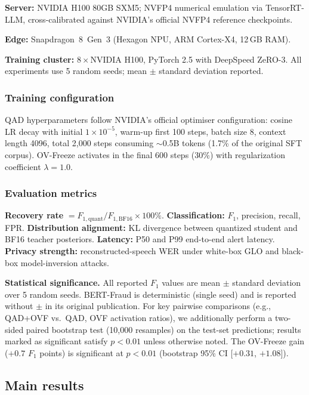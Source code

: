\documentclass[11pt, a4paper]{article}
\begin{document}
\textbf{Server:} NVIDIA H100 80GB SXM5; NVFP4 numerical emulation via TensorRT-LLM, cross-calibrated against NVIDIA's official NVFP4 reference checkpoints.

\textbf{Edge:} Snapdragon~8~Gen~3 (Hexagon NPU, ARM Cortex-X4, 12\,GB RAM).

\textbf{Training cluster:} $8\times$NVIDIA H100, PyTorch 2.5 with DeepSpeed ZeRO-3. All experiments use 5 random seeds; mean $\pm$ standard deviation reported.

\subsubsection{Training configuration}

QAD hyperparameters follow NVIDIA's official optimiser configuration: cosine LR decay with initial $1\times 10^{-5}$, warm-up first 100 steps, batch size 8, context length 4096, total 2{,}000 steps consuming $\sim$0.5B tokens (1.7\% of the original SFT corpus). OV-Freeze activates in the final 600 steps (30\%) with regularization coefficient $\lambda = 1.0$.

\subsubsection{Evaluation metrics}

\textbf{Recovery rate} $= F_{1,\mathrm{quant}}/F_{1,\mathrm{BF16}}\times 100\%$. \textbf{Classification:} $F_1$, precision, recall, FPR. \textbf{Distribution alignment:} KL divergence between quantized student and BF16 teacher posteriors. \textbf{Latency:} P50 and P99 end-to-end alert latency. \textbf{Privacy strength:} reconstructed-speech WER under white-box GLO and black-box model-inversion attacks.

\medskip
\noindent\textbf{Statistical significance.} All reported $F_1$ values are mean $\pm$ standard deviation over 5 random seeds. BERT-Fraud is deterministic (single seed) and is reported without $\pm$ in its original publication. For key pairwise comparisons (e.g., QAD+OVF vs.\ QAD, OVF activation ratios), we additionally perform a two-sided paired bootstrap test (10{,}000 resamples) on the test-set predictions; results marked as significant satisfy $p<0.01$ unless otherwise noted. The OV-Freeze gain ($+0.7$ $F_1$ points) is significant at $p<0.01$ (bootstrap 95\% CI [$+0.31$, $+1.08$]).

\subsection{Main results}
\end{document}
